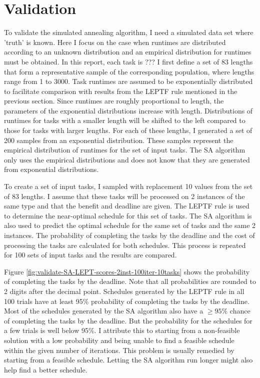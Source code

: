 \documentclass[12pt]{report}
\begin{document}
\section{Validation}

To validate the simulated annealing algorithm, I need a simulated data set where 'truth' is known.
Here I focus on the case when runtimes are distributed according to an unknown distribution and an empirical distribution for runtimes must be obtained.
In this report, each task is ???
I first define a set of 83 lengths that form a representative sample of the corresponding population, where lengths range from 1 to 3000.
Task runtimes are assumed to be exponentially distributed to facilitate comparison with results from the LEPTF rule mentioned in the previous section.
Since runtimes are roughly proportional to length, the parameters of the exponential distributions increase with length.
Distributions of runtimes for tasks with a smaller length will be shifted to the left compared to those for tasks with larger lengths.
For each of these lengths, I generated a set of 200 samples from an exponential distribution.
These samples represent the empirical distribution of runtimes for the set of input tasks. 
The SA algorithm only uses the empirical distributions and does not know that they are generated from exponential distributions.

To create a set of input tasks, I sampled with replacement 10 values from the set of 83 lengths.
I assume that these tasks will be processed on 2 instances of the same type and that the benefit and deadline are given.
The LEPTF rule is used to determine the near-optimal schedule for this set of tasks.
The SA algorithm is also used to predict the optimal schedule for the same set of tasks and the same 2 instances.
The probability of completing the tasks by the deadline and the cost of processing the tasks are calculated for both schedules.
This process is repeated for 100 sets of input tasks and the results are compared.

Figure \ref{fig:validate-SA-LEPT-scores-2inst-100iter-10tasks} shows the probability of completing the tasks by the deadline.
Note that all probabilities are rounded to 2 digits after the decimal point.
Schedules generated by the LEPTF rule in all 100 trials have at least 95\% probability of completing the tasks by the deadline.
Most of the schedules generated by the SA algorithm also have a $\geq 95\%$ chance of completing the tasks by the deadline.
But the probability for the schedules for a few trials is well below 95\%.
I attribute this to starting from a non-feasible solution with a low probability and being unable to find a feasible schedule within the given number of iterations.
This problem is usually remedied by starting from a feasible schedule.
Letting the SA algorithm run longer might also help find a better schedule.
\end{document}
